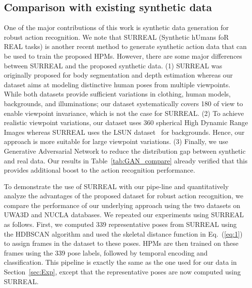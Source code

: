 \documentclass[twocolumn]{svjour3}          \smartqed  \usepackage{graphicx}
\begin{document}
\vspace{-3mm}

\subsection{Comparison with existing synthetic data}
One of the major contributions of this work is synthetic data generation for robust action recognition. We note that SURREAL (Synthetic hUmans foR REAL tasks) \citep{varol17} is another recent method to generate synthetic action data that can be used to train the proposed HPMs. However, there are some major differences between SURREAL and the proposed synthetic data. (1) SURREAL was originally  proposed for body segmentation and depth estimation whereas our  dataset aims at modeling distinctive human poses from multiple viewpoints. While both datasets provide sufficient variations in clothing, human models, backgrounds, and illuminations; our dataset systematically covers 180 of view to enable  viewpoint invariance, which is not the case for SURREAL. (2) To achieve realistic viewpoint variations, our dataset uses 360 spherical High Dynamic Range Images whereas SURREAL uses the LSUN dataset~\citep{journals/corr/YuZSSX15} for backgrounds. Hence, our approach is more suitable for  large viewpoint variations. (3) Finally, we use Generative Adversarial Network to reduce the distribution gap between synthetic and real data. Our results in Table~\ref{tab:GAN_compare} already verified that this provides additional boost to the action recognition performance.

To demonstrate the use of SURREAL with our pipe-line and  quantitatively  analyze the advantages of the proposed dataset for robust action recognition, we compare the performance of our underlying approach using the two datasets on UWA3D and NUCLA databases.  
We repeated our experiments  using SURREAL as follows. First, we computed 339 representative poses from SURREAL using the HDBSCAN algorithm \citep{mcinnes2017hdbscan}  and  used the skeletal distance function in Eq.~(\ref{eq:1}) to assign frames in the dataset to these poses. 
HPMs are then trained on these frames using the 339 pose labels, followed by temporal encoding and classification. This pipeline is exactly the same as the one used for our data in Section~\ref{sec:Exp}, except that the representative poses are now  computed using SURREAL.
\end{document}
